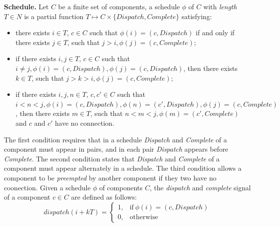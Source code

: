 

{\bf Schedule.}
Let $C$ be a finite set of components, a schedule $\phi$ of $C$ with \emph{length} $T\in N$ is a partial function $T \mapsto C\times \{Dispatch, Complete\}$ satisfying:
\begin{itemize}
	\item there exists $i\in T$, $c\in C$ such that $\phi(i) = (c, Dispatch)$ if and only if there exists $j\in T$, such that $j > i, \phi(j) =  (c, Complete)$;
	\item if there exists $i, j\in T$, $c\in C$ such that $i \neq j, \phi(i) = (c, Dispatch), \phi(j) = (c, Dispatch)$, then there exists $k\in T$, such that $j >k> i, \phi(j) =  (c, Complete)$;
	\item if there exists $i, j, n\in T$, $c, c'\in C$ such that $i < n < j, \phi(i) = (c, Dispatch), \phi(n) = (c', Dispatch), \phi(j) = (c, Complete)$, then there exists $m\in T$, such that $n < m < j, \phi(m) =  (c', Complete)$ and $c$ and $c'$ have no connection.
\end{itemize}
The first condition requires that in a schedule \emph{Dispatch} and \emph{Complete} of a component must appear in pairs, and in each pair \emph{Dispatch} appears before \emph{Complete}. 
The second condition states that \emph{Dispatch} and \emph{Complete} of a component must appear alternately in a schedule. 
The third condition allows a component to be \emph{preempted} by another component if they two have no coonection.
Given a schedule $\phi$ of components $C$, the \emph{dispatch} and \emph{complete} signal of a component $c \in C$ are defined as follows: 
\begin{equation}
\label{eqn:dispatch}
    dispatch(i+kT) =
    \begin{cases}
      1, & \text{if}\ \phi(i) = (c, Dispatch) \\
      0, & \text{otherwise}
    \end{cases}
\end{equation}

